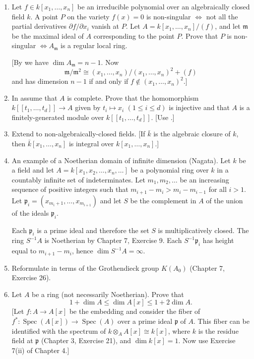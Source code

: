 \begin{enumerate}
\item Let $f\in k[x_1,\ldots,x_n]$ be an irreducible polynomial over an algebraically closed field $k$. A point $P$ on the variety $f(x)=0$ is non-singular $\Longleftrightarrow$ not all the partial derivatives $\partial f/\partial x_i$ vanish at $P$. Let $A=k[x_1,\ldots,x_n]/(f)$, and let $\mathfrak m$ be the maximal ideal of $A$ corresponding to the point $P$. Prove that $P$ is non-singular $\Longleftrightarrow A_{\mathfrak m}$ is a regular local ring.

[By  we have $\dim A_{\mathfrak m}=n-1$. Now
\[
 \mathfrak m/\mathfrak m^2\cong(x_1,\ldots,x_n)/(x_1,\ldots,x_n)^2+(f)
\]
and has dimension $n-1$ if and only if $f\notin(x_1,\ldots,x_n)^2$.]

\item In  assume that $A$ is complete. Prove that the homomorphism $k[[t_1,\ldots,t_d]]\longrightarrow A$ given by $t_i\mapsto x_i$ $(1\leq i\leq d)$ is injective and that $A$ is a finitely-generated module over $k[[t_1,\ldots,t_d]]$. [Use .]

\item Extend  to non-algebraically-closed fields. [If $\bar k$ is the algebraic closure of $k$, then $\bar k[x_1,\ldots,x_n]$ is integral over $k[x_1,\ldots,x_n]$.]

\item An example of a Noetherian domain of infinite dimension (Nagata). Let $k$ be a field and let $A=k[x_1,x_2,\ldots,x_n,\ldots]$ be a polynomial ring over $k$ in a countably infinite set of indeterminates. Let $m_1,m_2,\ldots$ be an increasing sequence of positive integers such that $m_{i+1}-m_i>m_i-m_{i-1}$ for all $i>1$. Let $\mathfrak p_i=(x_{m_i+1},\ldots,x_{m_{i+1}})$ and let $S$ be the complement in $A$ of the union of the ideals $\mathfrak p_i$.

Each $\mathfrak p_i$ is a prime ideal and therefore the set $S$ is multiplicatively closed. The ring $S^{-1}A$ is Noetherian by Chapter 7, Exercise 9. Each $S^{-1}\mathfrak p_i$ has height equal to $m_{i+1}-m_i$, hence $\dim S^{-1}A=\infty$.

\item Reformulate  in terms of the Grothendieck group $K(A_0)$ (Chapter 7, Exercise 26).

\item Let $A$ be a ring (not necessarily Noetherian). Prove that
\[
 1+\dim A\leq\dim A[x]\leq1+2\dim A.
\]
[Let $f:A\longrightarrow A[x]$ be the embedding and consider the fiber of $f^*:\operatorname{Spec}(A[x])\longrightarrow\operatorname{Spec}(A)$ over a prime ideal $\mathfrak p$ of $A$. This fiber can be identified with the spectrum of $k\otimes_A A[x]\cong k[x]$, where $k$ is the residue field at $\mathfrak p$ (Chapter 3, Exercise 21), and $\dim k[x]=1$. Now use Exercise 7(ii) of Chapter 4.]


\end{enumerate}

